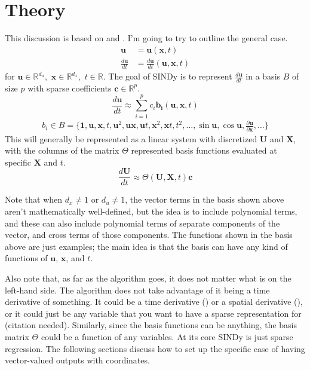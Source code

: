 \documentclass{article}
\let\vec\mathbf
\def\real{\mathbb{R}}
\begin{document}
\tableofcontents

\section{Theory}

This discussion is based on \cite{brunton2016sindy} and \cite{shea2020sindy-bvp}.
I'm going to try to outline the general case. 
\begin{align}
\vec{u} &= \vec{u}(\vec{x}, t) \\
\frac{d\vec{u}}{dt} &= \frac{d\vec{u}}{dt}(\vec{u}, \vec{x}, t)
\end{align}
for $\vec{u} \in \real^{d_u}, \,\, \vec{x} \in \real^{d_x}, \,\, t \in \real$.
The goal of SINDy is to represent $\frac{d\vec{u}}{dt}$ in a basis $B$ of size
$p$ with sparse coefficients $\vec{c} \in \real^p$.
\begin{equation}\label{eq:dudt-approx}
\frac{d\vec{u}}{dt} \approx \sum_{i=1}^p c_i \vec{b_i}(\vec{u},\vec{x},t)
\end{equation}
\begin{align}
b_i \in B = \{\vec{1}, \vec{u}, \vec{x}, t, \vec{u}^2, \vec{u}\vec{x},\vec{u}t,\vec{x}^2,\vec{x}t,t^2,\hdots,\sin\vec{u},\cos{\vec{u}}, \frac{\partial\vec{u}}{\partial \vec{x}},\hdots\}
\end{align}
This will generally be represented as a linear system with discretized $\vec{U}$
and $\vec{X}$, with the columns of the matrix $\Theta$ represented basis
functions evaluated at specific $\vec{X}$ and $t$.
\begin{equation}\label{eq:basis-system}
\frac{d\vec{U}}{dt} \approx \Theta(\vec{U}, \vec{X}, t) \vec{c}
\end{equation}

Note that when $d_x \ne 1$ or $d_u \ne 1$, the vector terms in the basis shown above
aren't mathematically well-defined, but the idea is to include polynomial terms,
and these can also include polynomial terms of separate components of the
vector, and cross terms of those components. The functions shown in the basis
above are just examples; the main idea is that the basis can have any kind of
functions of $\vec{u}$, $\vec{x}$, and $t$.

Also note that, as far as the algorithm goes, it does not matter what is on the
left-hand side. The algorithm does not take advantage of it being a time
derivative of something. It could be a time derivative (\cite{brunton2016sindy})
or a spatial derivative (\cite{shea2020sindy-bvp}), or it could just be any
variable that you want to have a sparse representation for (citation needed).
Similarly, since the basis functions can be anything, the basis matrix $\Theta$
could be a function of any variables. At its core SINDy is just sparse
regression. The following sections discuss how to set up the specific case of
having vector-valued outputs with coordinates.
\end{document}
